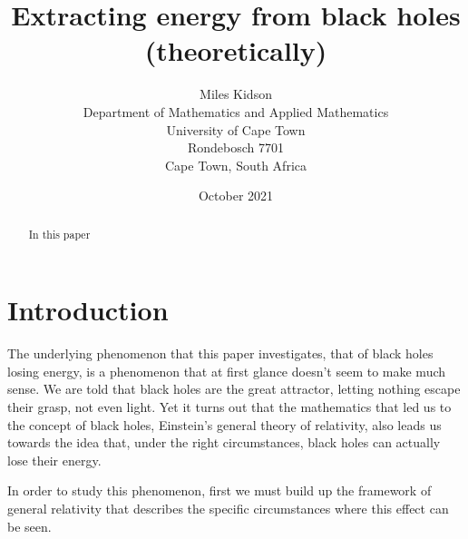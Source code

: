 \documentclass[11pt]{article}
\numberwithin{equation}{section}
\numberwithin{figure}{section}
\numberwithin{table}{section}
\begin{document}
\title{Extracting energy from black holes (theoretically)}
\author{Miles Kidson \\ Department of Mathematics and Applied Mathematics \\ University of Cape Town \\ Rondebosch 7701 \\ Cape Town, South Africa }
\date{October 2021}

\maketitle

\begin{center}
    \begin{abstract}
        In this paper
    \end{abstract}
\end{center}

\section{Introduction}\label{sec:Introduction}
\par The underlying phenomenon that this paper investigates, that of black holes losing energy, is a phenomenon that at first glance doesn't seem to make much sense. We are told that black holes are the great attractor, letting nothing escape their grasp, not even light. Yet it turns out that the mathematics that led us to the concept of black holes, Einstein's general theory of relativity, also leads us towards the idea that, under the right circumstances, black holes can actually lose their energy. 
\par In order to study this phenomenon, first we must build up the framework of general relativity that describes the specific circumstances where this effect can be seen. 
\end{document}
